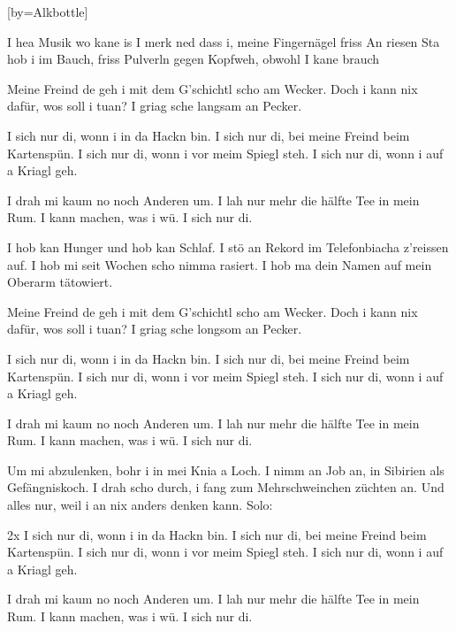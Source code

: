 
[by={Alkbottle}]

\chordson

\beginverse
I hea Musik wo kane is
I merk ned dass i, meine Fingernägel friss
An riesen Sta hob i im Bauch,
friss Pulverln gegen Kopfweh, obwohl I kane brauch

Meine Freind de geh i mit dem G'schichtl scho am Wecker.
Doch i kann nix dafür, wos soll i tuan? I griag sche langsam an Pecker.
\endverse

\beginchorus
I sich nur di, wonn i in da Hackn bin.
I sich nur di, bei meine Freind beim Kartenspün.
I sich nur di, wonn i vor meim Spiegl steh.
I sich nur di, wonn i auf a Kriagl geh.

I drah mi kaum no noch Anderen um.
I lah nur mehr die hälfte Tee in mein Rum.
I kann machen, was i wü. I sich nur di.
\endchorus


\beginverse

I hob kan Hunger und hob kan Schlaf.
I stö an Rekord im Telefonbiacha z'reissen auf.
I hob mi seit Wochen scho nimma rasiert.
I hob ma dein Namen auf mein Oberarm tätowiert.

Meine Freind de geh i mit dem G'schichtl scho am Wecker.
Doch i kann nix dafür, wos soll i tuan? I griag sche longsom an Pecker.
\endverse


\beginchorus
I sich nur di, wonn i in da Hackn bin.
I sich nur di, bei meine Freind beim Kartenspün.
I sich nur di, wonn i vor meim Spiegl steh.
I sich nur di, wonn i auf a Kriagl geh.

I drah mi kaum no noch Anderen um.
I lah nur mehr die hälfte Tee in mein Rum.
I kann machen, was i wü. I sich nur di.
\endchorus


\beginverse
Um mi abzulenken, bohr i in mei Knia a Loch.
I nimm an Job an, in Sibirien als Gefängniskoch.
I drah scho durch, i fang zum Mehrschweinchen züchten an.
Und alles nur, weil i an nix anders denken kann.
Solo:
\endverse


\beginchorus
2x
I sich nur di, wonn i in da Hackn bin.
I sich nur di, bei meine Freind beim Kartenspün.
I sich nur di, wonn i vor meim Spiegl steh.
I sich nur di, wonn i auf a Kriagl geh.

I drah mi kaum no noch Anderen um.
I lah nur mehr die hälfte Tee in mein Rum.
I kann machen, was i wü. I sich nur di.
\endchorus

\endsong